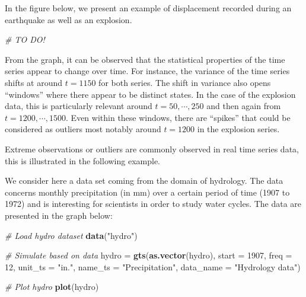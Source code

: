 \documentclass[]{book}
\newenvironment{Shaded}{\begin{snugshade}}{\end{snugshade}}
\newcommand{\CommentTok}[1]{\textcolor[rgb]{0.56,0.35,0.01}{\textit{#1}}}
\newcommand{\DataTypeTok}[1]{\textcolor[rgb]{0.13,0.29,0.53}{#1}}
\newcommand{\DecValTok}[1]{\textcolor[rgb]{0.00,0.00,0.81}{#1}}
\newcommand{\KeywordTok}[1]{\textcolor[rgb]{0.13,0.29,0.53}{\textbf{#1}}}
\newcommand{\NormalTok}[1]{#1}
\newcommand{\StringTok}[1]{\textcolor[rgb]{0.31,0.60,0.02}{#1}}
\theoremstyle{definition}
\theoremstyle{definition}
\theoremstyle{definition}
\theoremstyle{remark}
\let\BeginKnitrBlock\begin \let\EndKnitrBlock\end
\begin{document}
\BeginKnitrBlock{example}
\protect\hypertarget{exm:earthquake}{}{\label{exm:earthquake} }In the figure
below, we present an example of displacement recorded during an
earthquake as well as an explosion.
\EndKnitrBlock{example}

\begin{Shaded}
\begin{Highlighting}[]
\CommentTok{# TO DO!}
\end{Highlighting}
\end{Shaded}

From the graph, it can be observed that the statistical properties of
the time series appear to change over time. For instance, the variance
of the time series shifts at around \(t = 1150\) for both series. The
shift in variance also opens ``windows'' where there appear to be
distinct states. In the case of the explosion data, this is particularly
relevant around \(t = 50, \cdots, 250\) and then again from
\(t = 1200, \cdots, 1500\). Even within these windows, there are
``spikes'' that could be considered as outliers most notably around
\(t = 1200\) in the explosion series.

Extreme observations or outliers are commonly observed in real time
series data, this is illustrated in the following example.

\BeginKnitrBlock{example}
\protect\hypertarget{exm:percipitation}{}{\label{exm:percipitation} }We
consider here a data set coming from the domain of hydrology. The data
concerns monthly precipitation (in mm) over a certain period of time
(1907 to 1972) and is interesting for scientists in order to study water
cycles. The data are presented in the graph below:
\EndKnitrBlock{example}

\begin{Shaded}
\begin{Highlighting}[]
\CommentTok{# Load hydro dataset}
\KeywordTok{data}\NormalTok{(}\StringTok{"hydro"}\NormalTok{)}

\CommentTok{# Simulate based on data}
\NormalTok{hydro =}\StringTok{ }\KeywordTok{gts}\NormalTok{(}\KeywordTok{as.vector}\NormalTok{(hydro), }\DataTypeTok{start =} \DecValTok{1907}\NormalTok{, }\DataTypeTok{freq =} \DecValTok{12}\NormalTok{, }\DataTypeTok{unit_ts =} \StringTok{"in."}\NormalTok{, }
            \DataTypeTok{name_ts =} \StringTok{"Precipitation"}\NormalTok{, }\DataTypeTok{data_name =} \StringTok{"Hydrology data"}\NormalTok{)}

\CommentTok{# Plot hydro }
\KeywordTok{plot}\NormalTok{(hydro)}
\end{Highlighting}
\end{Shaded}
\end{document}
